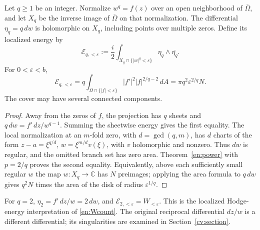 \begin{proposition}\label{en:rootcover}
Let $q\ge1$ be an integer. Normalize $w^q=f(z)$ over an open neighborhood of $\overline\Omega$, and let $X_q$ be the inverse image of $\overline\Omega$ on that normalization. The differential
$\eta_q=q\,dw$ is holomorphic on $X_q$, including points over multiple
zeros. Define its localized energy by
\[
 \mathcal E_{q,<\varepsilon}
 :=\frac i2\int_{X_q\cap\{|w|^q<\varepsilon\}}
                    \eta_q\wedge\overline{\eta_q}.
\]
For $0<\varepsilon<b$,
\begin{equation}\label{en:qcover}
 \boxed{\mathcal E_{q,<\varepsilon}
 =q\int_{\Omega\cap\{|f|<\varepsilon\}}
          |f'|^2|f|^{2/q-2}\,dA
 =\pi q^2\varepsilon^{2/q}N.}
\end{equation}
The cover may have several connected components.
\end{proposition}
\begin{proof}
Away from the zeros of $f$, the projection has $q$ sheets and
$q\,dw=f'\,dz/w^{q-1}$. Summing the sheetwise energy gives the first
equality. The local normalization at an $m$-fold zero, with
$d=\gcd(q,m)$, has $d$ charts of the form
$z-a=\xi^{q/d}$, $w=\xi^{m/d}v(\xi)$, with $v$ holomorphic and nonzero.
Thus $dw$ is regular, and the omitted branch set has zero area.
Theorem~\ref{en:power} with $p=2/q$ proves the second equality.
Equivalently, above each sufficiently small regular $w$ the map
$w:X_q\to\mathbb C$ has $N$ preimages; applying the area formula to
$q\,dw$ gives $q^2N$ times the area of the disk of radius
$\varepsilon^{1/q}$.
\end{proof}

For $q=2$, $\eta_2=f'\,dz/w=2\,dw$, and
$\mathcal E_{2,<\varepsilon}=W_{<\varepsilon}$.
This is the localized Hodge-energy interpretation of
\eqref{en:Wcount}. The original reciprocal differential $dz/w$ is a
different differential; its singularities are examined in
Section~\ref{cv:section}.
